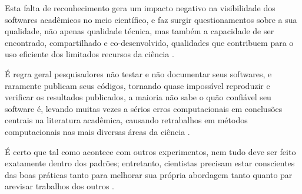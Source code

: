 

Esta falta de reconhecimento gera um impacto negativo na visibilidade dos
softwares acadêmicos no meio científico, e faz surgir questionamentos sobre a
sua qualidade, não apenas qualidade técnica, mas também a capacidade de ser
encontrado, compartilhado e co-desenvolvido, qualidades que contribuem para o
uso eficiente dos limitados recursos da ciência \cite{howison2013,
katz2014transitive}.

%
%

É regra geral pesquisadores não testar e não documentar seus softwares, e
raramente publicam seus códigos, tornando quase impossível reproduzir e
verificar os resultados publicados, a maioria não sabe o quão confiável seu
software é, levando muitas vezes a sérios erros computacionais em conclusões
centrais na literatura acadêmica, causando retrabalhos em métodos
computacionais nas mais diversas áreas da ciência
\cite{Merali2010Computational}.

É certo que tal como acontece com outros
experimentos, nem tudo deve ser feito exatamente dentro dos padrões;
entretanto, cientistas precisam estar conscientes das boas práticas tanto para
melhorar sua própria abordagem tanto quanto par arevisar trabalhos dos outros
\cite{wilson2014best}.

